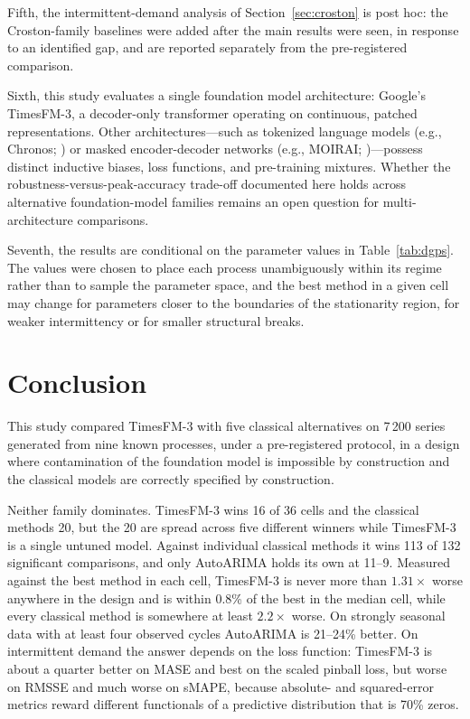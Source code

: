 \documentclass[article]{ajs}
\providecommand{\sectionref}[1]{Section~\ref{#1}}
\providecommand{\tableref}[1]{Table~\ref{#1}}
\begin{document}
Fifth, the intermittent-demand analysis of \sectionref{sec:croston} is post hoc: the
Croston-family baselines were added after the main results were seen, in response to an
identified gap, and are reported separately from the pre-registered comparison.

Sixth, this study evaluates a single foundation model architecture: Google's TimesFM-3, a
decoder-only transformer operating on continuous, patched representations. Other architectures---such
as tokenized language models (e.g., Chronos; \citealp{ansari2024chronos}) or masked encoder-decoder
networks (e.g., MOIRAI; \citealp{woo2024moirai})---possess distinct inductive biases, loss functions,
and pre-training mixtures. Whether the robustness-versus-peak-accuracy trade-off documented here
holds across alternative foundation-model families remains an open question for multi-architecture comparisons.

Seventh, the results are conditional on the parameter values in \tableref{tab:dgps}. The values
were chosen to place each process unambiguously within its regime rather than to sample the
parameter space, and the best method in a given cell may change for parameters closer to the
boundaries of the stationarity region, for weaker intermittency or for smaller structural breaks.

\section{Conclusion}
\label{sec:conclusion}

This study compared TimesFM-3 with five classical alternatives on 7\,200 series generated from nine
known processes, under a pre-registered protocol, in a design where contamination of the
foundation model is impossible by construction and the classical models are correctly specified
by construction.

Neither family dominates. TimesFM-3 wins 16 of 36 cells and the classical methods 20, but the
20 are spread across five different winners while TimesFM-3 is a single untuned model. Against
individual classical methods it wins 113 of 132 significant comparisons, and only AutoARIMA
holds its own at 11--9. Measured against the best method in each cell, TimesFM-3 is never more
than $1.31\times$ worse anywhere in the design and is within 0.8\% of the best in the median
cell, while every classical method is somewhere at least $2.2\times$ worse. On strongly seasonal
data with at least four observed cycles AutoARIMA is 21--24\% better. On intermittent demand the
answer depends on the loss function: TimesFM-3 is about a quarter better on MASE and best on the
scaled pinball loss, but worse on RMSSE and much worse on sMAPE, because absolute- and
squared-error metrics reward different functionals of a predictive distribution that is 70\%
zeros.
\end{document}
